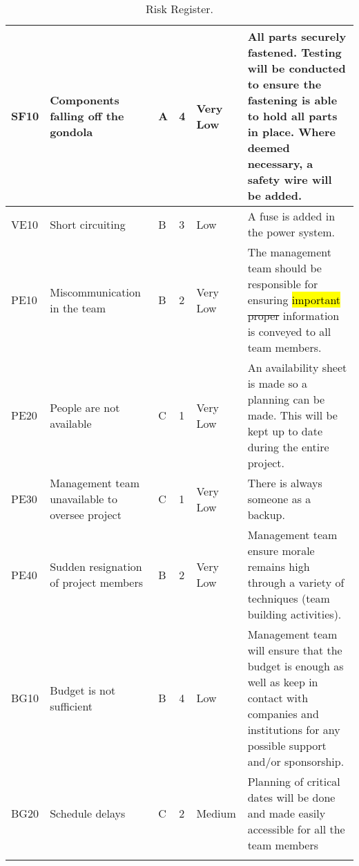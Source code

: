 \begin{longtable}{|m{}| m{} |m{} |m{}|m{}| m{}|}
SF10 & Components falling off the gondola									& A & 4 & \cellcolor[HTML]{34FF34}Very Low	& All parts securely fastened. Testing will be conducted to ensure the fastening is able to hold all parts in place. Where deemed necessary, a safety wire will be added.\\\hline

VE10 & Short circuiting														& B & 3 & \cellcolor[HTML]{FCFF2F}Low			& A fuse is added in the power system.\\\hline

PE10 & Miscommunication in the team											& B & 2 & \cellcolor[HTML]{34FF34}Very Low	& The management team should be responsible for ensuring \hl{important} \st{proper} information is conveyed to all team members.\\\hline

PE20 & People are not available												& C & 1 & \cellcolor[HTML]{34FF34}Very Low	& An availability sheet is made so a planning can be made. This will be kept up to date during the entire project.\\\hline

PE30 & Management team unavailable to oversee project						& C & 1 & \cellcolor[HTML]{34FF34}Very Low	& There is always someone as a backup.\\\hline

PE40 & Sudden resignation of project members								& B & 2 & \cellcolor[HTML]{34FF34}Very Low	& Management team ensure morale remains high through a variety of techniques (team building activities).\\\hline

BG10 & Budget is not sufficient & B & 4 & \cellcolor[HTML]{FCFF2F}Low & Management team will ensure that the budget is enough as well as keep in contact with companies and institutions for any possible support and/or sponsorship. \\ \hline

BG20 & Schedule delays & C & 2 & \cellcolor[HTML]{F39C12} Medium & Planning of critical dates will be done and made easily accessible for all the team members \\ \hline



\caption{Risk Register.}
\label{tab:risk-register}
\end{longtable}
\raggedbottom